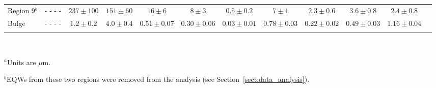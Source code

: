 \begin{table}
\begin{minipage}{200mm}
\begin{tabular}{l c c  c  c  c  c  c  c  c  c c }
 Region 9$^b$ & - - - -                 & $237\pm100$          & $151\pm60$        & $16\pm6$                 & $8\pm3$                   & $0.5\pm0.2$             & $7\pm1$                   & $2.3\pm0.6$             & $3.6\pm0.8$                 & $2.4\pm0.8$  \\
 Bulge       & - - - -                          & $1.2\pm0.2$            & $4.0\pm0.4$        & $0.51\pm0.07$         & $0.30\pm0.06$        & $0.03\pm0.01$        & $0.78\pm0.03$        & $0.22\pm0.02$        & $0.49\pm0.03$            & $1.16\pm0.04$ \\             
\hline
 \label{EQW}
\end{tabular}\\
{$^a$Units are $\mu$m.
 
$^b$EQWs from these two regions were removed from the analysis (see Section~\ref{sect:data_analysis}).}
\end{minipage}
\end{table}





